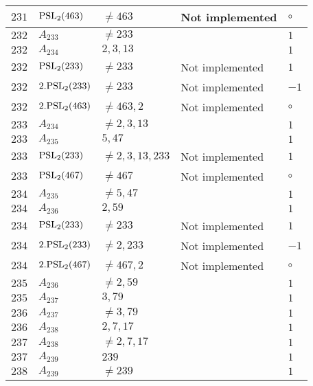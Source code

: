 \documentclass[a4paper, 11pt]{article}
\begin{document}
\begin{longtable}{lllll}
        $ 231 $ & $ {\rm PSL}_{2}(463) $ & $ \neq 463 $ & Not implemented & $\circ$ \\ \hline
        $ 232 $ & $ A_{233} $ & $ \neq 233 $ & $ ~ $ & $ 1  $ \\ \hline
        $ 232 $ & $ A_{234} $ & $ 2, 3, 13 $ & $ ~ $ & $ 1  $ \\ \hline
        $ 232 $ & $ {\rm PSL}_{2}(233) $ & $ \neq 233 $ & Not implemented & $ 1  $ \\ \hline
        $ 232 $ & $ 2.{\rm PSL}_{2}(233) $ & $ \neq 233 $ & Not implemented & $ -1  $ \\ \hline
        $ 232 $ & $ 2.{\rm PSL}_{2}(463) $ & $ \neq 463, 2 $ & Not implemented & $\circ$ \\ \hline
        $ 233 $ & $ A_{234} $ & $ \neq 2, 3, 13 $ & $ ~ $ & $ 1  $ \\ \hline
        $ 233 $ & $ A_{235} $ & $ 5, 47 $ & $ ~ $ & $ 1  $ \\ \hline
        $ 233 $ & $ {\rm PSL}_{2}(233) $ & $ \neq 2, 3, 13, 233 $ & Not implemented & $ 1  $ \\ \hline
        $ 233 $ & $ {\rm PSL}_{2}(467) $ & $ \neq 467 $ & Not implemented & $\circ$ \\ \hline
        $ 234 $ & $ A_{235} $ & $ \neq 5, 47 $ & $ ~ $ & $ 1  $ \\ \hline
        $ 234 $ & $ A_{236} $ & $ 2, 59 $ & $ ~ $ & $ 1  $ \\ \hline
        $ 234 $ & $ {\rm PSL}_{2}(233) $ & $ \neq 233 $ & Not implemented & $ 1  $ \\ \hline
        $ 234 $ & $ 2.{\rm PSL}_{2}(233) $ & $ \neq 2, 233 $ & Not implemented & $ -1  $ \\ \hline
        $ 234 $ & $ 2.{\rm PSL}_{2}(467) $ & $ \neq 467, 2 $ & Not implemented & $\circ$ \\ \hline
        $ 235 $ & $ A_{236} $ & $ \neq 2, 59 $ & $ ~ $ & $ 1  $ \\ \hline
        $ 235 $ & $ A_{237} $ & $ 3, 79 $ & $ ~ $ & $ 1  $ \\ \hline
        $ 236 $ & $ A_{237} $ & $ \neq 3, 79 $ & $ ~ $ & $ 1  $ \\ \hline
        $ 236 $ & $ A_{238} $ & $ 2, 7, 17 $ & $ ~ $ & $ 1  $ \\ \hline
        $ 237 $ & $ A_{238} $ & $ \neq 2, 7, 17 $ & $ ~ $ & $ 1  $ \\ \hline
        $ 237 $ & $ A_{239} $ & $ 239 $ & $ ~ $ & $ 1  $ \\ \hline
        $ 238 $ & $ A_{239} $ & $ \neq 239 $ & $ ~ $ & $ 1  $ \\ \hline

\end{longtable}
\end{document}
